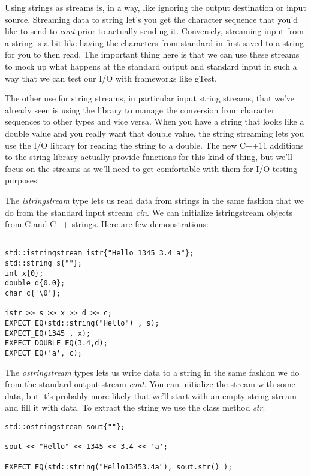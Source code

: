 \documentclass[]{tufte-handout}
\begin{document}
Using strings as streams is, in a way, like ignoring the output destination or input source. Streaming data to string let's you get the character sequence that you'd like to send to \textit{cout} prior to actually sending it.  Conversely, streaming input from a string is a bit like having the characters from standard in first saved to a string for you to then read.  The important thing here is that we can use these streams to mock up what happens at the standard output and standard input in such a way that we can test our I/O with frameworks like gTest. 

The other use for string streams, in particular input string streams, that we've already seen is using the library to manage the conversion from character sequences to other types and vice versa. When you have a string that looks like a double value and you really want that double value, the string streaming lets you use the I/O library for reading the string to a double. The new C++11 additions to the string library actually provide functions for this kind of thing, but we'll focus on the streams as we'll need to get comfortable with them for I/O testing purposes. 

The \textit{istringstream} type lets us read data from strings in the same fashion that we do from the standard input stream \textit{cin}. We can initialize istringstream objects from C and C++ strings. Here are few demonstrations:
\begin{verbatim}

std::istringstream istr{"Hello 1345 3.4 a"};
std::string s{""};
int x{0};
double d{0.0};
char c{'\0'};

istr >> s >> x >> d >> c;
EXPECT_EQ(std::string("Hello") , s);
EXPECT_EQ(1345 , x);
EXPECT_DOUBLE_EQ(3.4,d);
EXPECT_EQ('a', c);
\end{verbatim}

The \textit{ostringstream} types lets us write data to a string in the same fashion we do from the standard output stream \textit{cout}. You can initialize the stream with some data, but it's probably more likely that we'll start with an empty string stream and fill it with data. To extract the string we use the class method \textit{str}.
\begin{verbatim}
std::ostringstream sout{""};

sout << "Hello" << 1345 << 3.4 << 'a';

EXPECT_EQ(std::string("Hello13453.4a"), sout.str() );
\end{verbatim}
\end{document}
